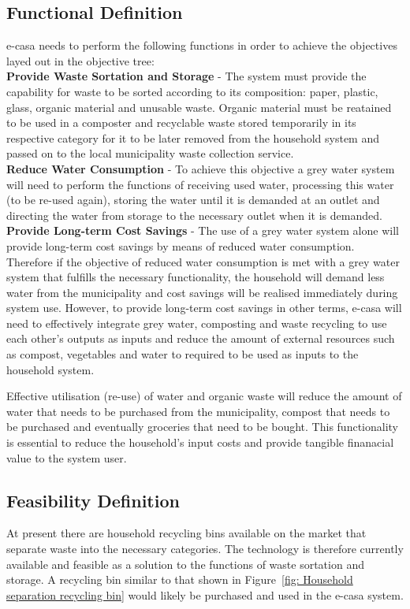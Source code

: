 \documentclass[a4paper,11pt,fleqn]{report}
\begin{document}
\subsection{Functional Definition}
\ac{e-casa} needs to perform the following functions in order to achieve the objectives layed out in the objective tree:\\

\noindent\textbf{Provide Waste Sortation and Storage} - The system must provide the capability for waste to be sorted according to its composition: paper, plastic, glass, organic material and unusable waste. Organic material must be reatained to be used in a composter and recyclable waste stored temporarily in its respective category for it to be later removed from the household system and passed on to the local municipality waste collection service.\\

\noindent\textbf{Reduce Water Consumption} - To achieve this objective a grey water system will need to perform the functions of receiving used water, processing this water (to be re-used again), storing the water until it is demanded at an outlet and directing the water from storage to the necessary outlet when it is demanded.\\

\noindent\textbf{Provide Long-term Cost Savings} - The use of a grey water system alone will provide long-term cost savings by means of reduced water consumption. Therefore if the objective of reduced water consumption is met with a grey water system that fulfills the necessary functionality, the household will demand less water from the municipality and cost savings will be realised immediately during system use. However, to provide long-term cost savings in other terms, \ac{e-casa} will need to effectively integrate grey water, composting and waste recycling to use each other's outputs as inputs and reduce the amount of external resources such as compost, vegetables and water to required to be used as inputs to the household system.

Effective utilisation (re-use) of water and organic waste will reduce the amount of water that needs to be purchased from the municipality, compost that needs to be purchased and eventually groceries that need to be bought. This functionality is essential to reduce the household's input costs and provide tangible finanacial value to the system user.

\subsection{Feasibility Definition}
At present there are household recycling bins available on the market that separate waste into the necessary categories. The technology is therefore currently available and feasible as a solution to the functions of waste sortation and storage. A recycling bin similar to that shown in Figure~\ref{fig: Household separation recycling bin} would likely be purchased and used in the \ac{e-casa} system.
\end{document}
